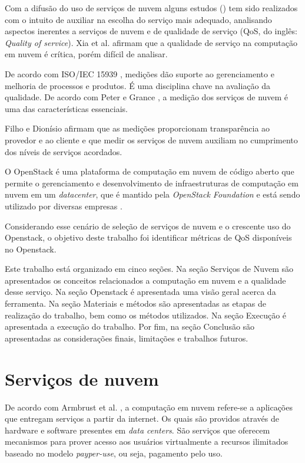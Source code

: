 \documentclass[conference]{IEEEtran}
\begin{document}
Com a difusão do uso de serviços de nuvem alguns estudos (\cite{soltani2016, garg2011, li2012, 
bardsiri2014, lesun2016, quarati2016}) tem sido realizados com o intuito de auxiliar na 
escolha do serviço mais adequado, analisando aspectos inerentes a serviços de nuvem e de qualidade de serviço 
(QoS, do inglês: \textit{Quality of service}). Xia et al. \cite{xia2013} afirmam que a qualidade de serviço na computação
em nuvem é crítica, porém difícil de analisar.  

De acordo com ISO/IEC 15939 \cite{iso15939}, medições dão suporte ao gerenciamento e melhoria de processos e produtos. É uma disciplina
chave na avaliação da qualidade. De acordo com Peter e Grance \cite{mell2011nist}, a medição dos serviços de nuvem é 
uma das características essenciais. 

Filho e Dionísio \cite{leite2016influencia} afirmam que as medições proporcionam
transparência ao provedor e ao cliente e que medir os serviços de nuvem auxiliam no 
cumprimento dos níveis de serviços acordados.

O OpenStack \cite{openstack_general} é uma plataforma de computação em nuvem de código aberto que permite o gerenciamento e desenvolvimento 
de infraestruturas de computação em nuvem em um \textit{datacenter}, que é mantido pela 
\textit{OpenStack Foundation} e está sendo utilizado por diversas empresas \cite{openstack} \cite{bui2016}.

Considerando esse cenário de seleção de serviços de nuvem e o crescente uso do Openstack, o objetivo deste trabalho foi identificar
métricas de QoS disponíveis no Openstack.

Este trabalho está organizado em cinco seções. 
Na seção Serviços de Nuvem são apresentados os conceitos relacionados a computação em nuvem e a qualidade desse serviço. 
Na seção Openstack é apresentada uma visão geral acerca da ferramenta.
Na seção Materiais e métodos são apresentadas as etapas de realização do trabalho, bem como os métodos utilizados. 
Na seção Execução é apresentada a execução do trabalho.
Por fim, na seção Conclusão são apresentadas as considerações finais, limitações e trabalhos futuros.


\section{Serviços de nuvem}
De acordo com Armbrust et al. \cite{armbrust2010view}, a computação em nuvem refere-se a aplicações que entregam serviços a 
partir da internet. Os quais são providos através de hardware e software presentes em \textit{data centers}.
São serviços que oferecem mecanismos para prover acesso aos usuários virtualmente a recursos ilimitados baseado no 
modelo \textit{payper-use}, ou seja, pagamento pelo uso. \cite{sefraoui2012openstack}
\end{document}
